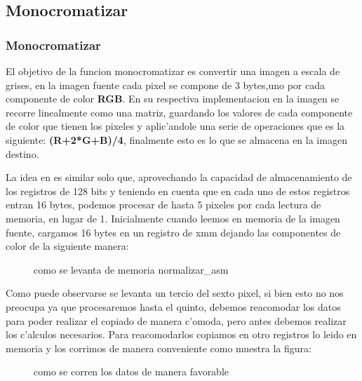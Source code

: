\subsection{Monocromatizar}
\subsubsection{Monocromatizar  }
El objetivo de la funcion monocromatizar es convertir una imagen a escala de grises, en la imagen fuente
cada pixel se compone de 3 bytes,uno por cada componente de color \textbf{RGB}. En su respectiva implementacion en 
\C la imagen se recorre linealmente como una matriz, guardando los valores de cada componente de color
que tienen los pixeles y aplic'andole una serie de operaciones que es la siguiente:
\textbf{(R+2*G+B)/4}, finalmente esto es lo que se almacena en la imagen destino.

La idea en \ass es similar solo que, aprovechando la capacidad de almacenamiento de los registros de 128 bits
y teniendo en cuenta que en cada uno de estos registros entran 16 bytes, podemos procesar de hasta 5 pixeles
por cada lectura de memoria, en lugar de 1. Inicialmente cuando leemos en memoria de la imagen fuente, cargamos 16 bytes en un registro de xmm dejando 
las componentes de color de la siguiente manera: 

\begin{figure}[hb]
\caption{como se levanta de memoria normalizar\_asm}
\label{est:m-uno}
\end{figure}
Como puede observarse se levanta un tercio del sexto pixel, si bien esto no nos preocupa ya que procesaremos
hasta el quinto, debemos reacomodar los datos para poder realizar el copiado de manera c'omoda, pero
antes debemos realizar los c'alculos necesarios. Para reacomodarlos  copiamos en otro registros
lo leido en memoria y los corrimos de manera conveniente como muestra la figura: 
\begin{figure}[hb]
\caption{como se corren los datos de manera favorable}
\label{est:m-uno}
\end{figure}

